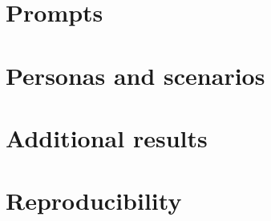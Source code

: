 
\chapter{Prompts}
\label{app:prompts}

\chapter{Personas and scenarios}
\label{app:personas}

\chapter{Additional results}
\label{app:results}

\chapter{Reproducibility}
\label{app:repro}
